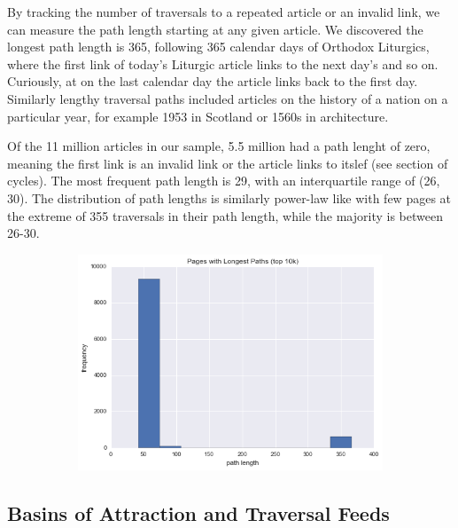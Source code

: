 \documentclass[twoside]{article}
\begin{document}
By tracking the number of traversals to a repeated article or an invalid link, we can measure
the path length starting at any given article. 
We discovered the longest path length is 365, following 365 calendar days of Orthodox Liturgics, where the first link of today's Liturgic article links to the next day's and so on. Curiously, 
at on the last calendar day the article links back to the first day.
Similarly lengthy traversal paths included articles on the history of a nation on a particular year, for example 1953 in Scotland or 1560s in architecture.

Of the 11 million articles in our sample, 5.5 million had a path lenght of zero, meaning the first link is an invalid link or the article links to itslef (see section of cycles).
The most frequent path length is 29, with an interquartile range of (26, 30). The distribution of 
path lengths is similarly power-law like with few pages at the extreme of 355 traversals in their path length, while the majority is between 26-30.

\begin{figure}[H]
\centering
    \caption{Longest Path Lengths}
    \begin{subfigure}[b]{0.5\textwidth}
        \includegraphics[width=\textwidth]{graphics/top_1k_path_length.png}
    \end{subfigure}
\end{figure}

\subsection{Basins of Attraction and Traversal Feeds}
\end{document}
